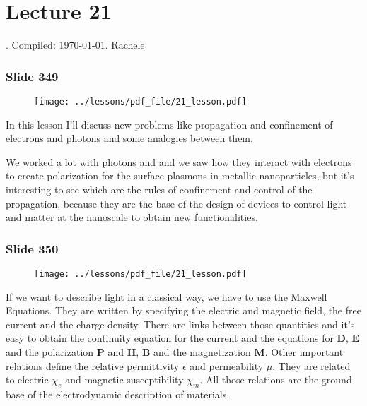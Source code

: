 \documentclass[../main/main.tex]{subfiles}
\begin{document}
\section{Lecture 21}
 . Compiled:  \today. Rachele 

\renewcommand\vec{\mathbf}

\subsubsection{Slide 349}


\begin{figure}[h!]
\centering
\texttt{[image: ../lessons/pdf\_file/21\_lesson.pdf]}
\end{figure}


In this lesson I’ll discuss new problems like propagation and confinement of electrons and photons and some analogies between them.

We worked a lot with photons and and we saw how they interact with electrons to create polarization for the surface plasmons in metallic nanoparticles, but it's interesting to see which are the rules of confinement and control of the propagation, because they are the base of the design of devices to control light and matter at the nanoscale to obtain new functionalities. 


\newpage


\subsubsection{Slide 350}

\begin{figure}[h!]
\centering
\texttt{[image: ../lessons/pdf\_file/21\_lesson.pdf]}
\end{figure}

If we want to describe light in a classical way, we have to use the Maxwell Equations.
They are written by specifying the electric and magnetic field, the free current and the charge density.
There are links between those quantities and it’s easy to obtain the continuity equation for the current and the equations for $\vec{D}$, $\vec{E}$ and the polarization $\vec{P}$ and $\vec{H}$, $\vec{B}$ and the magnetization $\vec{M}$. 
Other important relations define the relative permittivity $\epsilon$ and permeability $\mu$. They are related to electric $\chi_e$ and magnetic susceptibility $\chi_m$.
All those relations are the ground base of the electrodynamic description of materials.
\end{document}

